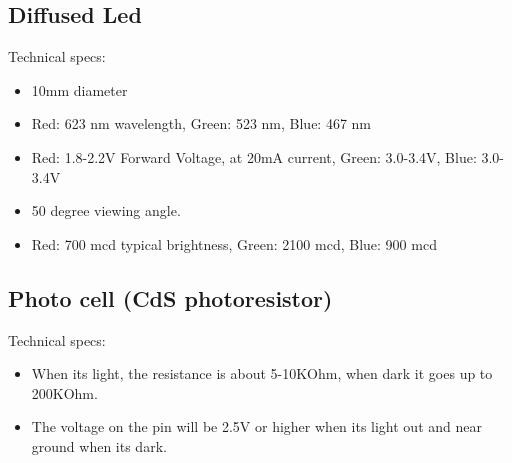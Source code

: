 \documentclass[12pt]{report}
\begin{document}
\begin{appendices}
\subsection{Diffused Led}
Technical specs:
\begin{itemize}
\item 10mm diameter
\item Red: 623 nm wavelength, Green: 523 nm, Blue: 467 nm
\item Red: 1.8-2.2V Forward Voltage, at 20mA current, Green: 3.0-3.4V, Blue: 3.0-3.4V
\item 50 degree viewing angle.
\item Red: 700 mcd typical brightness, Green: 2100 mcd, Blue: 900 mcd
\end{itemize}
\subsection{Photo cell (CdS photoresistor)}
Technical specs:
\begin{itemize}
\item When its light, the resistance is about 5-10KOhm, when dark it goes up to 200KOhm.
\item The voltage on the pin will be 2.5V or higher when its light out and near ground when its dark.
\end{itemize}
\end{appendices}
\end{document}
